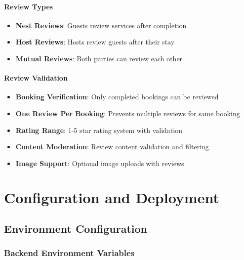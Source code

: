 \documentclass[12pt,a4paper]{article}
\begin{document}
\paragraph{Review Types}
\begin{itemize}
\item \textbf{Nest Reviews}: Guests review services after completion
\item \textbf{Host Reviews}: Hosts review guests after their stay
\item \textbf{Mutual Reviews}: Both parties can review each other
\end{itemize}

\paragraph{Review Validation}
\begin{itemize}
\item \textbf{Booking Verification}: Only completed bookings can be reviewed
\item \textbf{One Review Per Booking}: Prevents multiple reviews for same booking
\item \textbf{Rating Range}: 1-5 star rating system with validation
\item \textbf{Content Moderation}: Review content validation and filtering
\item \textbf{Image Support}: Optional image uploads with reviews
\end{itemize}

\section{Configuration and Deployment}
\label{sec:deployment}

\subsection{Environment Configuration}
\label{subsec:environment-config}

\subsubsection{Backend Environment Variables}
\label{subsubsec:backend-env}
\end{document}
